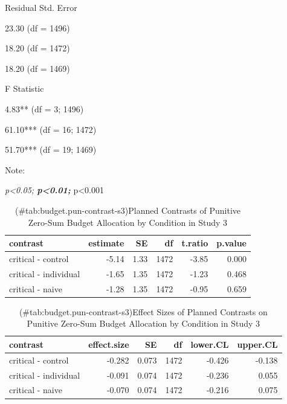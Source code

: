 \documentclass[
]{book}
\begin{document}
Residual Std. Error

23.30 (df = 1496)

18.20 (df = 1472)

18.20 (df = 1469)

F Statistic

4.83** (df = 3; 1496)

61.10*** (df = 16; 1472)

51.70*** (df = 19; 1469)

Note:

\emph{p\textless0.05; \textbf{p\textless0.01; }}p\textless0.001

\begin{table}

\caption{(\#tab:budget.pun-contrast-s3)Planned Contrasts of Punitive Zero-Sum Budget Allocation by Condition in Study 3}
\centering
\fontsize{13}{15}\selectfont
\begin{tabular}[t]{lrrrrr}
\toprule
contrast & estimate & SE & df & t.ratio & p.value\\
\midrule
critical - control & -5.14 & 1.33 & 1472 & -3.85 & 0.000\\
critical - individual & -1.65 & 1.35 & 1472 & -1.23 & 0.468\\
critical - naive & -1.28 & 1.35 & 1472 & -0.95 & 0.659\\
\bottomrule
\end{tabular}
\end{table}

\begin{table}

\caption{(\#tab:budget.pun-contrast-s3)Effect Sizes of Planned Contrasts on Punitive Zero-Sum Budget Allocation by Condition in Study 3}
\centering
\fontsize{13}{15}\selectfont
\begin{tabular}[t]{lrrrrr}
\toprule
contrast & effect.size & SE & df & lower.CL & upper.CL\\
\midrule
critical - control & -0.282 & 0.073 & 1472 & -0.426 & -0.138\\
critical - individual & -0.091 & 0.074 & 1472 & -0.236 & 0.055\\
critical - naive & -0.070 & 0.074 & 1472 & -0.216 & 0.075\\
\bottomrule
\end{tabular}
\end{table}
\end{document}
